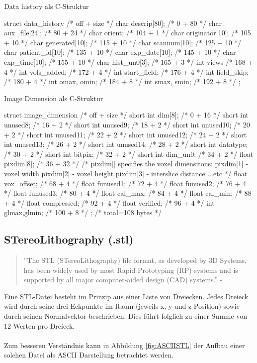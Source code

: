 \begin{program}
	\caption{Data history als C-Struktur \citep{AnalyzeFormat}}
	\label{prog:dataHist}
	\begin{CCode}
struct data_history
{ /* off + size */
	char descrip[80]; /* 0 + 80 */
	char aux_file[24]; /* 80 + 24 */
	char orient; /* 104 + 1 */
	char originator[10]; /* 105 + 10 */
	char generated[10]; /* 115 + 10 */
	char scannum[10]; /* 125 + 10 */
	char patient_id[10]; /* 135 + 10 */
	char exp_date[10]; /* 145 + 10 */
	char exp_time[10]; /* 155 + 10 */
	char hist_un0[3]; /* 165 + 3 */
	int views /* 168 + 4 */
	int vols_added; /* 172 + 4 */
	int start_field; /* 176 + 4 */
	int field_skip; /* 180 + 4 */
	int omax, omin; /* 184 + 8 */
	int smax, smin; /* 192 + 8 */
}; 
	\end{CCode}
\end{program}

\begin{program}[H]
	\caption{Image Dimension als C-Struktur \citep{AnalyzeFormat}}
	\label{prog:imageDim}
	\begin{CCode}
struct image_dimension
{ /* off + size */
	short int dim[8]; /* 0 + 16 */
	short int unused8; /* 16 + 2 */
	short int unused9; /* 18 + 2 */
	short int unused10; /* 20 + 2 */
	short int unused11; /* 22 + 2 */
	short int unused12; /* 24 + 2 */
	short int unused13; /* 26 + 2 */
	short int unused14; /* 28 + 2 */
	short int datatype; /* 30 + 2 */
	short int bitpix; /* 32 + 2 */
	short int dim_un0; /* 34 + 2 */
	float pixdim[8]; /* 36 + 32 */
	/*
	pixdim[] specifies the voxel dimensitons:
	pixdim[1] - voxel width
	pixdim[2] - voxel height
	pixdim[3] - interslice distance
	...etc
	*/
	float vox_offset; /* 68 + 4 */
	float funused1; /* 72 + 4 */
	float funused2; /* 76 + 4 */
	float funused3; /* 80 + 4 */
	float cal_max; /* 84 + 4 */
	float cal_min; /* 88 + 4 */
	float compressed; /* 92 + 4 */
	float verified; /* 96 + 4 */
	int glmax,glmin; /* 100 + 8 */
}; /* total=108 bytes */ 
	\end{CCode}
\end{program}

\subsection{STereoLithography (.stl)}
\begin{quote}
	''The STL (STereoLithography) file format, as developed by 3D Systems, has been widely used by most Rapid Prototyping (RP) systems and is supported by all major computer-aided design (CAD) systems.'' - \citep{STereoLithography}
\end{quote}
Eine STL-Datei besteht im Prinzip aus einer Liste von Dreiecken. Jedes Dreieck wird durch seine drei Eckpunkte im Raum (jeweils x, y und z Position) sowie durch seinen Normalvektor beschrieben. Dies führt folglich zu einer Summe von 12 Werten pro Dreieck.\\
\\
Zum besseren Verständnis kann in Abbildung \ref{fig:ASCIISTL} der Aufbau einer solchen Datei als ASCII Darstellung betrachtet werden. 

